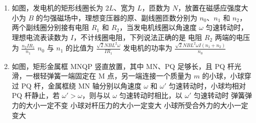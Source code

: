 \documentclass[\gkver]{gaokaozhenti}
\begin{document}
\begin{enumerate}
{B．当金属棒到达 $x_{0}$ 处时，导体棒产生的感应电动势为
$E'=2Bvx_{0}\tan\theta$
则电容器的电荷量为
$Q=CE'=2BCvx_{0}\tan\theta$
B 错误；

D．由于导体棒做匀速运动则
$F=F_{\text{安}}=BIL$
由选项 A 可知流过导体棒的电流 $I$ 恒定，但 $L$ 与 $t$ 成正比，则 $F$ 为变力，再根据力做功的功率公式
$P=Fv$
可看出 $F$ 为变力，$v$ 不变则功率 $P$ 随力 $F$ 变化而变化；D 错误；

故选 A。
}

\item
如图，发电机的矩形线圈长为 $2L$、宽为 $L$，匝数为 $N$，放置在磁感应强度大小为 $B$ 的匀强磁场中，理想变压器的原、副线圈匝数分别为 $n_{0}$、$n_{1}$ 和 $n_{2}$，两个副线圈分别接有电阻 $R_{1}$ 和 $R_{2}$，当发电机线圈以角速度 $\omega$ 匀速转动时，理想电流表读数为 $I$，不计线圈电阻，下列说法正确的是
{电阻 $R_{2}$ 两端的电压为 $\frac{n_{2}IR_{1}}{n_{1}}$}
{$n_{0}$ 与 $n_{1}$ 的比值为 $\frac{\sqrt{2}NBL^{2}\omega}{IR_{1}}$}
{发电机的功率为 $\frac{\sqrt{2}NBL^{2}\omega I(n_{1}+n_{2})}{n_{0}}$}


\item
如图，矩形金属框 MNQP 竖直放置，其中 MN、PQ 足够长，且 PQ 杆光滑，一根轻弹簧一端固定在 M 点，另一端连接一个质量为 $m$ 的小球，小球穿过 PQ 杆，金属框绕 MN 轴分别以角速度 $\omega$ 和 $\omega'$ 匀速转动时，小球均相对 PQ 杆静止，若 $\omega'>\omega$，则与以 $\omega$ 匀速转动时相比，以 $\omega'$ 匀速转动时
{弹簧弹力的大小一定不变}
{小球对杆压力的大小一定变大}
{小球所受合外力的大小一定变大}


\end{enumerate}
\end{document}
